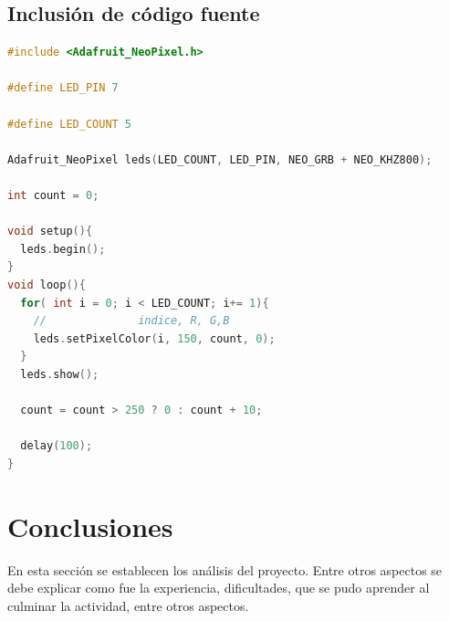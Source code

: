 \documentclass{article}
\begin{document}
\subsection{Inclusión de código fuente}

\begin{lstlisting}[language=C++, caption=Ejemplo código Arduino]
#include <Adafruit_NeoPixel.h>

#define LED_PIN 7

#define LED_COUNT 5

Adafruit_NeoPixel leds(LED_COUNT, LED_PIN, NEO_GRB + NEO_KHZ800);

int count = 0;

void setup(){
  leds.begin();  
}
void loop(){
  for( int i = 0; i < LED_COUNT; i+= 1){
    //              indice, R, G,B
    leds.setPixelColor(i, 150, count, 0);
  }
  leds.show();

  count = count > 250 ? 0 : count + 10;
  
  delay(100);
}

\end{lstlisting}

\section{Conclusiones} \label{conclusiones}
En esta sección se establecen los análisis del proyecto. Entre otros aspectos se debe explicar como fue la experiencia, dificultades, que se pudo aprender al culminar la actividad, entre otros aspectos.



\end{document}
